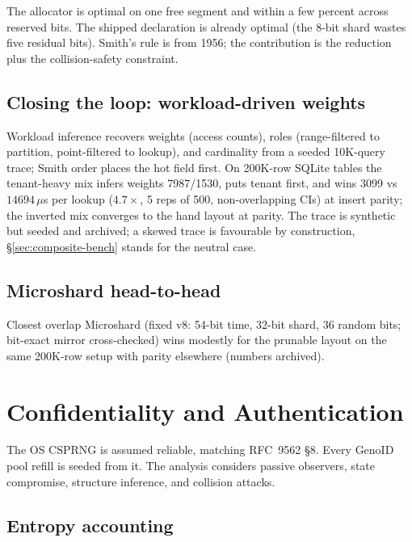 \documentclass{svproc}
\begin{document}
The allocator is optimal on one free segment and within a few percent across reserved bits. The shipped declaration is already optimal (the 8-bit shard wastes five residual bits). Smith's rule is from 1956; the contribution is the reduction plus the collision-safety constraint.

\subsection{Closing the loop: workload-driven weights}
\label{sec:workload-planning}

Workload inference recovers weights (access counts), roles (range-filtered to partition, point-filtered to lookup), and cardinality from a seeded 10K-query trace; Smith order places the hot field first. On 200K-row SQLite tables the tenant-heavy mix infers weights 7987/1530, puts tenant first, and wins $3099$ vs $14694\,\mu$s per lookup ($4.7\times$, 5 reps of 500, non-overlapping CIs) at insert parity; the inverted mix converges to the hand layout at parity. The trace is synthetic but seeded and archived; a skewed trace is favourable by construction, \S\ref{sec:composite-bench} stands for the neutral case.

\subsection{Microshard head-to-head}
\label{sec:microshard}

Closest overlap Microshard (fixed v8: 54-bit time, 32-bit shard, 36 random bits; bit-exact mirror cross-checked) wins modestly for the prunable layout on the same 200K-row setup with parity elsewhere (numbers archived). 

\section{Confidentiality and Authentication}
\label{sec:security}

The OS CSPRNG is assumed reliable, matching RFC~9562 \S8. Every GenoID pool refill is seeded from it. The analysis considers passive observers, state compromise, structure inference, and collision attacks.

\subsection{Entropy accounting}
\label{sec:entropy-accounting}
\end{document}
